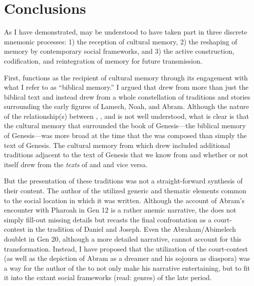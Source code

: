 \section{Conclusions}

As I have demonstrated, \ga may be understood to have taken part in three discrete mnemonic processes: 1) the reception of cultural memory, 2) the reshaping of memory by contemporary social frameworks, and 3) the active construction, codification, and reintegration of memory for future transmission. 

First, \ga functions as the recipient of cultural memory through its engagement with what I refer to as  ``biblical memory.'' I argued that \ga drew from more than just the biblical text and instead drew from a whole constellation of traditions and stories surrounding the early figures of Lamech, Noah, and Abram. Although the nature of the relationship(s) between \firstenoch, \jub, and \ga is not well understood, what is clear is that the cultural memory that surrounded the book of Genesis---the biblical memory of Genesis---was more broad at the time that the \ga was composed than simply the text of Genesis. The cultural memory from which \ga drew included additional traditions adjacent to the text of Genesis that we know from \jub and \firstenoch whether or not \ga itself drew from the \emph{texts} of \jub and \firstenoch and vice versa.


But the presentation of these traditions was not a straight-forward synthesis of their content. The author of the \ga utilized generic and thematic elements common to the social location in which it was written. Although the account of Abram's encounter with Pharoah in Gen 12 is a rather anemic narrative, the \ga does not simply fill-out missing details but recasts the final confrontation as a court-contest in the tradition of Daniel and Joseph. Even the Abraham/Abimelech doublet in Gen 20, although a more detailed narrative, cannot account for this transformation. Instead, I have proposed that the utilization of the court-contest (as well as the depiction of Abram as a dreamer and his sojourn as diaspora) was a way for the author of the \ga to not only make his narrative entertaining, but to fit it into the extant social frameworks (read: genres) of the late \secondtemple period.

